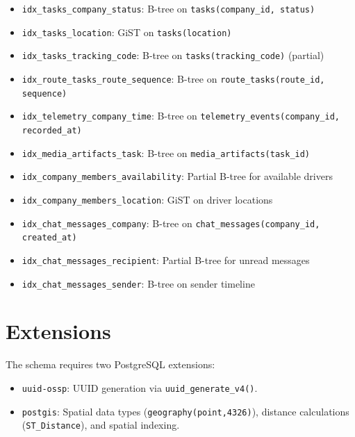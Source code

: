 \begin{itemize}
  \item \texttt{idx\_tasks\_company\_status}: B-tree on \texttt{tasks(company\_id, status)}
  \item \texttt{idx\_tasks\_location}: GiST on \texttt{tasks(location)}
  \item \texttt{idx\_tasks\_tracking\_code}: B-tree on \texttt{tasks(tracking\_code)} (partial)
  \item \texttt{idx\_route\_tasks\_route\_\allowbreak sequence}: B-tree on \texttt{route\_tasks\allowbreak(route\_id, sequence)}
  \item \texttt{idx\_telemetry\_company\_time}: B-tree on \texttt{telemetry\_events\allowbreak(company\_id, recorded\_at)}
  \item \texttt{idx\_media\_artifacts\_task}: B-tree on \texttt{media\_artifacts(task\_id)}
  \item \texttt{idx\_company\_members\_\allowbreak availability}: Partial B-tree for available drivers
  \item \texttt{idx\_company\_members\_location}: GiST on driver locations
  \item \texttt{idx\_chat\_messages\_company}: B-tree on \texttt{chat\_messages\allowbreak(company\_id, created\_at)}
  \item \texttt{idx\_chat\_messages\_recipient}: Partial B-tree for unread messages
  \item \texttt{idx\_chat\_messages\_sender}: B-tree on sender timeline
\end{itemize}

\section{Extensions}

The schema requires two PostgreSQL extensions:
\begin{itemize}
  \item \texttt{uuid-ossp}: UUID generation via \texttt{uuid\_generate\_v4()}.
  \item \texttt{postgis}: Spatial data types (\texttt{geography(point,4326)}),
        distance calculations (\texttt{ST\_Distance}), and spatial indexing.
\end{itemize}
